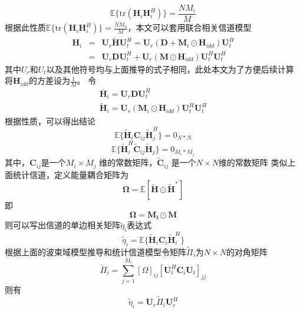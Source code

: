 \documentclass[bachelor,nocolorlinks, printoneside]{seuthesis} %
\begin{document}
\begin{Main}
\begin{equation}
\mathbb{E} \lbrace \mathrm{tr} (\mathbf{H}_i \mathbf{H}_i^H ) \rbrace = \frac{N M_i}{M}
\end{equation}
根据此性质$\mathbb{E} \lbrace \mathrm{tr} (\mathbf{H}_i \mathbf{H}_i^H ) \rbrace = \frac{N M_k}{M}$，本文可以套用联合相关信道模型
\begin{eqnarray}\label{key}
\mathbf{H}_i & = & \mathbf{U}_{r}\tilde{\mathbf{H}}\mathbf{U}_{t}^{H} = \mathbf{U}_{r}(\mathbf{D}+\mathbf{M}_i\odot \mathbf{H}_{idd})\mathbf{U}_{t}^{H} \\ \nonumber
& = & \mathbf{U}_{r}\mathbf{D}\mathbf{U}_{t}^{H} + \mathbf{U}_{r}(\mathbf{M}\odot \mathbf{H}_{idd})\mathbf{U}_{t}^{H}\mathbf{U}_{t}^{H}
\end{eqnarray}
其中$U_r$和$U_t$以及其他符号均与上面推导的式子相同，此处本文为了方便后续计算将$\mathbf{H}_{idd}$的方差设为$\frac{1}{M}$。
令
\begin{eqnarray}\label{key}
\overline{\mathbf{H}}_i = \mathbf{U}_{r}\mathbf{D}\mathbf{U}_{t}^{H} \\
\tilde{\mathbf{H}}_i = \mathbf{U}_{r}(\mathbf{M}_i\odot \mathbf{H}_{idd})\mathbf{U}_{t}^{H}\mathbf{U}_{t}^{H}
\end{eqnarray}
根据性质，可以得出结论
\begin{equation}\label{key}
\mathbb{E} \lbrace \tilde{\mathbf{H}}_i \mathbf{C}_{ij} \tilde{\mathbf{H}}_j^{H} \rbrace = 0_{N*N}
\end{equation}
\begin{equation}\label{key}
\mathbb{E} \lbrace \tilde{\mathbf{H}}_i^{H} \tilde{\mathbf{C}}_{ij} \tilde{\mathbf{H}}_j \rbrace = 0_{M_i*M_j}
\end{equation}
其中，$\mathbf{C}_{ij}$是一个$M_i \times M_j$ 维的常数矩阵，$\tilde{\mathbf{C}}_{ij}$ 是一个$N \times N$维的常数矩阵
类似上面统计信道，定义能量耦合矩阵为
\begin{equation}\label{key}
\bm{\Omega} =\mathbb{E}[\tilde{\mathbf{H}} \odot \tilde{\mathbf{H}}^{*}]
\end{equation}
即
\begin{equation}\label{key}
\bm{\Omega} =\mathbf{M_i} \odot \mathbf{M}
\end{equation}
则可以写出信道的单边相关矩阵$\tilde{\eta}_i$表达式
\begin{equation}\label{key}
\tilde{\eta}_i = \mathbb{E} \lbrace \tilde{\mathbf{H}}_i \mathbf{C}_i \tilde{\mathbf{H}}_i^H \rbrace
\end{equation}
根据上面的波束域模型推导和统计信道模型令矩阵$\tilde{\Pi}_i$为$N \times N$的对角矩阵
\begin{equation}\label{key}
\tilde{\Pi}_i = \sum_{j=1}^{M_i}[\Omega]_{ij}  [\mathbf{U}_t^H \mathbf{C}_i \mathbf{U}_t]_{jj}
\end{equation}
则有
\begin{equation}\label{key}
\tilde{\eta}_i = \mathbf{U}_r \tilde{\Pi}_i \mathbf{U}_r^H
\end{equation}

\end{Main}
\end{document}
